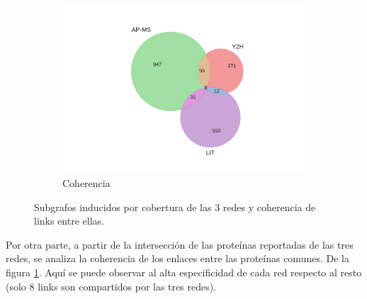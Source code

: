 \begin{figure}[!ht]
\begin{subfigure}[b]{0.48\columnwidth}
        \includegraphics[width=\textwidth]{./schemes/venn_AP-MS-Y2H-LIT_links.pdf}
        \caption{\label{fig:cohe} Coherencia}
    \end{subfigure}
    \caption{\label{fig:venn} Subgrafos inducidos por cobertura de las 3 redes y coherencia de links entre ellas. }
\end{figure}

\vspace{1.5cm}
Por otra parte, a partir de la intersecci\'on de las prote\'inas reportadas de las tres redes, se analiza la coherencia
de los enlaces entre las prote\'inas comunes. De la figura \ref{fig:cohe}. Aqu\'i se puede observar al alta especificidad
de cada red respecto al resto (solo 8 links son compartidos por las tres redes). 


